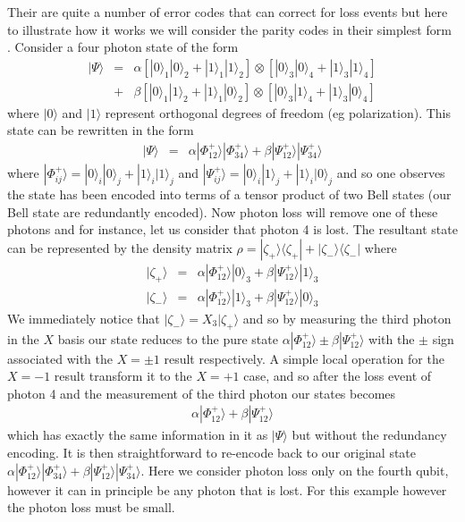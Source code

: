 \documentclass[twocolumn, aps, rmp, amsmath, amssymb, nofootinbib, superscriptaddress, longbibliography, floatfix, table-of-contents, eqsecnum]{revtex4-1}
\begin{document}
Their are quite a number of error codes that can correct for loss events but here to illustrate how it works we will consider the parity codes in their simplest form \cite{ralph05,munro12}. Consider a four photon state of the form
\begin{align}
|\Psi\rangle &=& \alpha \left[|0\rangle_1 |0\rangle_2+|1\rangle_1 |1\rangle_2\right] \otimes \left[|0\rangle_3 |0\rangle_4+|1\rangle_3 |1\rangle_4\right] \nonumber \\
&+& \beta \left[|0\rangle_1 |1\rangle_2+|1\rangle_1 |0\rangle_2\right] \otimes \left[|0\rangle_3 |1\rangle_4+|1\rangle_3 |0\rangle_4\right]
\end{align}
where $|0\rangle$ and $|1\rangle$ represent orthogonal degrees of freedom (eg polarization). This state can be rewritten in the form
\begin{align}
|\Psi\rangle &=& \alpha |\Phi_{12}^+\rangle  |\Phi_{34}^+\rangle+\beta |\Psi_{12}^+\rangle  |\Psi_{34}^+\rangle
\end{align}
where $ |\Phi_{ij}^+\rangle=|0\rangle_i |0\rangle_j+|1\rangle_i |1\rangle_j$ and $ |\Psi_{ij}^+\rangle=|0\rangle_i |1\rangle_j+|1\rangle_i |0\rangle_j$ and so one observes the state has been encoded into terms of a tensor product of two Bell states (our Bell state are redundantly encoded). Now photon loss will remove one of these photons and for instance, let us consider that photon 4 is lost. The resultant state can be represented by the density matrix
$\rho= |\zeta_+\rangle \langle \zeta_+| +|\zeta_-\rangle \langle \zeta_-|$ where 
\begin{align}
|\zeta_+\rangle &=&  \alpha |\Phi_{12}^+\rangle |0\rangle_3 + \beta  |\Psi_{12}^+\rangle |1\rangle_3 \nonumber \\
|\zeta_-\rangle &=&  \alpha |\Phi_{12}^+\rangle |1\rangle_3 + \beta  |\Psi_{12}^+\rangle |0\rangle_3 \nonumber
\end{align}
We immediately notice that $|\zeta_-\rangle=X_3 |\zeta_+\rangle$ and so by measuring the third photon in the $X$ basis our state reduces to the pure state $\alpha |\Phi_{12}^+\rangle \pm \beta  |\Psi_{12}^+\rangle$ with the $\pm$ sign associated with the $X=\pm 1$ result respectively. A simple local operation for the $X=-1$ result transform it to the $X=+1$ case, and so after the loss event of photon 4 and the measurement of the third photon our states becomes 
\begin{align}
\alpha |\Phi_{12}^+\rangle + \beta  |\Psi_{12}^+\rangle 
\end{align}
which has exactly the same information in it as  $|\Psi\rangle$ but without the redundancy encoding. It is then straightforward to re-encode back to our original state $ \alpha |\Phi_{12}^+\rangle  |\Phi_{34}^+\rangle+\beta |\Psi_{12}^+\rangle  |\Psi_{34}^+\rangle$. Here we consider photon loss only on the fourth qubit, however it can in principle be any photon that is lost. For this example however the photon loss must be small.
\end{document}
